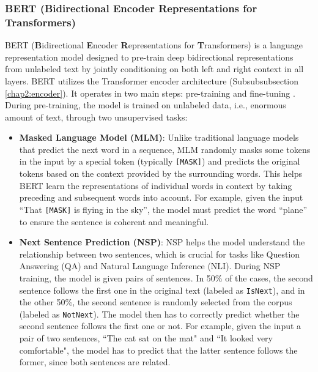 \subsubsection{BERT (Bidirectional Encoder Representations for Transformers)}
\label{chap2:bert}

BERT (\textbf{B}idirectional \textbf{E}ncoder \textbf{R}epresentations for \textbf{T}ransformers) is a language representation model designed to pre-train deep bidirectional representations from unlabeled text by jointly conditioning on both left and right context in all layers. BERT utilizes the Transformer encoder architecture (Subsubsubsection \ref{chap2:encoder}). It operates in two main steps: pre-training and fine-tuning \citep{devlin2019bertpretrainingdeepbidirectional}. During pre-training, the model is trained on unlabeled data, i.e., enormous amount of text, through two unsupervised tasks:
\begin{itemize}
    \item \textbf{Masked Language Model (MLM)}: Unlike traditional language models that predict the next word in a sequence, MLM randomly masks some tokens in the input by a special token (typically \texttt{[MASK]}) and predicts the original tokens based on the context provided by the surrounding words. This helps BERT learn the representations of individual words in context by taking preceding and subsequent words into account. For example, given the input ``That \texttt{[MASK]} is flying in the sky'', the model must predict the word ``plane'' to ensure the sentence is coherent and meaningful.
    
    \item \textbf{Next Sentence Prediction (NSP)}: NSP helps the model understand the relationship between two sentences, which is crucial for tasks like Question Answering (QA) and Natural Language Inference (NLI). During NSP training, the model is given pairs of sentences. In 50\% of the cases, the second sentence follows the first one in the original text (labeled as \texttt{IsNext}), and in the other 50\%, the second sentence is randomly selected from the corpus (labeled as \texttt{NotNext}). The model then has to correctly predict whether the second sentence follows the first one or not. For example, given the input a pair of two sentences, ``The cat sat on the mat" and ``It looked very comfortable", the model has to predict that the latter sentence follows the former, since both sentences are related. 
\end{itemize}

